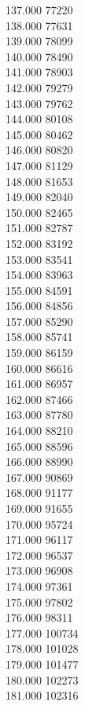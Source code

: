 { 137.000	77220 \\
 138.000	77631 \\
 139.000	78099 \\
 140.000	78490 \\
 141.000	78903 \\
 142.000	79279 \\
 143.000	79762 \\
 144.000	80108 \\
 145.000	80462 \\
 146.000	80820 \\
 147.000	81129 \\
 148.000	81653 \\
 149.000	82040 \\
 150.000	82465 \\
 151.000	82787 \\
 152.000	83192 \\
 153.000	83541 \\
 154.000	83963 \\
 155.000	84591 \\
 156.000	84856 \\
 157.000	85290 \\
 158.000	85741 \\
 159.000	86159 \\
 160.000	86616 \\
 161.000	86957 \\
 162.000	87466 \\
 163.000	87780 \\
 164.000	88210 \\
 165.000	88596 \\
 166.000	88990 \\
 167.000	90869 \\
 168.000	91177 \\
 169.000	91655 \\
 170.000	95724 \\
 171.000	96117 \\
 172.000	96537 \\
 173.000	96908 \\
 174.000	97361 \\
 175.000	97802 \\
 176.000	98311 \\
 177.000	100734 \\
 178.000	101028 \\
 179.000	101477 \\
 180.000	102273 \\
 181.000	102316 \\
}
